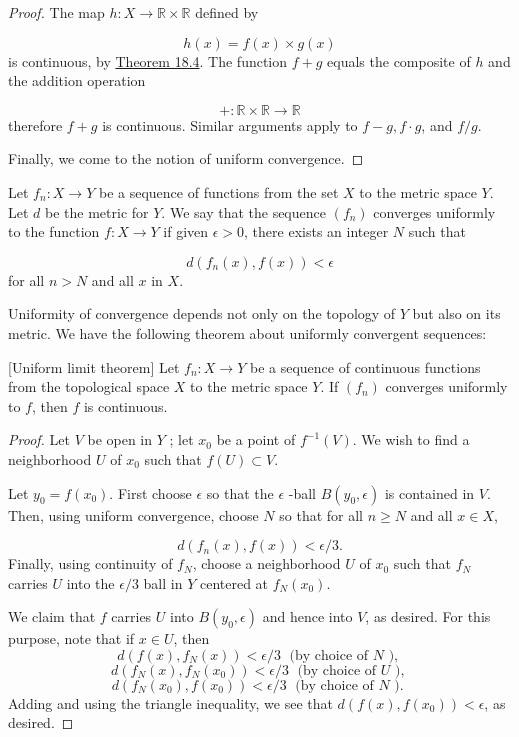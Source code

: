 \begin{proof}
 The map \(h : X \rightarrow \mathbb{R} \times \mathbb{R}\) defined by

 \[
 h(x) = f(x) \times g(x)
 \]
 is continuous, by \hyperref[thm:18.4]{Theorem 18.4}. The function \(f + g\) equals the composite of \(h\) and the addition operation

 \[
 + : \mathbb{R} \times \mathbb{R} \rightarrow \mathbb{R}
 \]
 therefore \(f + g\) is continuous. Similar arguments apply to \(f - g,f \cdot g\), and \(f/g\).

 Finally, we come to the notion of uniform convergence.
\end{proof}

\begin{definition}
 Let \(f_{n} : X \rightarrow Y\) be a sequence of functions from the set \(X\) to the metric space \(Y\). Let \(d\) be the metric for \(Y\). We say that the sequence \(( f_{n})\) converges uniformly to the function \(f : X \rightarrow Y\) if given \(\epsilon > 0\), there exists an integer \(N\) such that

 \[
 d( {f_{n}(x),f(x) }) < \epsilon
 \]
 for all \(n > N\) and all \(x\) in \(X\).
\end{definition}

Uniformity of convergence depends not only on the topology of \(Y\) but also on its metric. We have the following theorem about uniformly convergent sequences:

\begin{theorem}
\label{thm:\thetheorem}[Uniform limit theorem]
 Let \(f_{n} : X \rightarrow Y\) be a sequence of continuous functions from the topological space \(X\) to the metric space \(Y\). If \(( f_{n})\) converges uniformly to \(f\), then \(f\) is continuous.
\end{theorem}

\begin{proof}
 Let \(V\) be open in \(Y\) ; let \(x_{0}\) be a point of \(f^{-1}( V)\). We wish to find a neighborhood \(U\) of \(x_{0}\) such that \(f( U) \subset V\).

 Let \(y_{0} = f( x_{0})\). First choose \(\epsilon\) so that the \(\epsilon\) -ball \(B( {y_{0},\epsilon })\) is contained in \(V\). Then, using uniform convergence, choose \(N\) so that for all \(n \geq N\) and all \(x \in X\),

 \[
 d( {f_{n}(x),f(x) }) < \epsilon /3\text{.}
 \]
 Finally, using continuity of \(f_{N}\), choose a neighborhood \(U\) of \(x_{0}\) such that \(f_{N}\) carries \(U\) into the \(\epsilon /3\) ball in \(Y\) centered at \(f_{N}( x_{0})\).

 We claim that \(f\) carries \(U\) into \(B( {y_{0},\epsilon })\) and hence into \(V\), as desired. For this purpose, note that if \(x \in U\), then
 \[
 d( {f(x),f_{N}(x) }) < \epsilon /3\;\text{ (by choice of }N\text{ ), }
 \]
 \[
 d( {f_{N}(x),f_{N}( x_{0}) }) < \epsilon /3\;\text{ (by choice of }U\text{ ), }
 \]
 \[
 d( {f_{N}( x_{0}),f( x_{0}) }) < \epsilon /3\;\text{ (by choice of }N\text{ ). }
 \]
 Adding and using the triangle inequality, we see that \(d( {f(x),f( x_{0}) }) < \epsilon\), as desired.
\end{proof}

